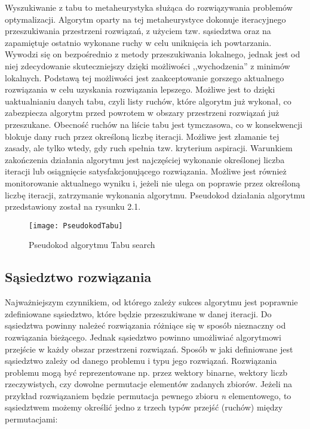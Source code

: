 Wyszukiwanie z tabu to metaheurystyka służąca do rozwiązywania problemów optymalizacji. Algorytm oparty na tej metaheurystyce dokonuje iteracyjnego przeszukiwania przestrzeni rozwiązań, z użyciem tzw. sąsiedztwa oraz na zapamiętuje ostatnio wykonane ruchy w celu uniknięcia ich powtarzania. Wywodzi się on bezpośrednio z metody przeszukiwania lokalnego, jednak jest od niej zdecydowanie skuteczniejszy dzięki możliwości ,,wychodzenia'' z minimów lokalnych. Podstawą tej możliwości jest zaakceptowanie gorszego aktualnego rozwiązania w celu uzyskania rozwiązania lepszego. Możliwe jest to dzięki uaktualnianiu danych tabu, czyli listy ruchów, które algorytm już wykonał, co zabezpiecza algorytm przed powrotem w obszary przestrzeni rozwiązań już przeszukane. Obecność ruchów na liście tabu jest tymczasowa, co w konsekwencji blokuje dany ruch przez określoną liczbę iteracji. Możliwe jest złamanie tej zasady, ale tylko wtedy, gdy ruch spełnia tzw. kryterium aspiracji. Warunkiem zakończenia działania algorytmu jest najczęściej wykonanie określonej liczba iteracji lub osiągnięcie satysfakcjonującego rozwiązania. Możliwe jest również monitorowanie aktualnego wyniku i, jeżeli nie ulega on poprawie przez określoną liczbę iteracji, zatrzymanie wykonania algorytmu. Pseudokod działania algorytmu przedstawiony został na rysunku 2.1.

\begin{figure}
	\centering
	\texttt{[image: PseudokodTabu]}
	\caption{Pseudokod algorytmu Tabu search}
	\label{fig: AlgorytmTabu}
\end{figure}

\subsection{Sąsiedztwo rozwiązania}

Najważniejszym czynnikiem, od którego zależy sukces algorytmu jest poprawnie zdefiniowane sąsiedztwo, które będzie przeszukiwane w danej iteracji. Do sąsiedztwa powinny należeć rozwiązania różniące się w sposób nieznaczny od rozwiązania bieżącego. Jednak sąsiedztwo powinno umożliwiać algorytmowi przejście w każdy obszar przestrzeni rozwiązań. Sposób w jaki definiowane jest sąsiedztwo zależy od danego problemu i typu jego rozwiązań. Rozwiązania problemu mogą być reprezentowane np. przez wektory binarne, wektory liczb rzeczywistych, czy dowolne permutacje elementów zadanych zbiorów. Jeżeli na przykład rozwiązaniem będzie permutacja pewnego zbioru \textit{n} elementowego, to sąsiedztwem możemy określić jedno z trzech typów przejść (ruchów) między permutacjami:

